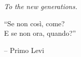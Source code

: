 \documentclass[english]{report}
\begin{document}
\renewcommand\contentsname{Index}
\frontespizio
\beforepreface

{
\raggedleft \large \sl To the new generations.\\
	
	\vspace{2cm}
	
	``Se non così, come?\\E se non ora, quando?''
	
	\bigskip
	
	\--- Primo Levi\\
}

% 
%

\end{document}
